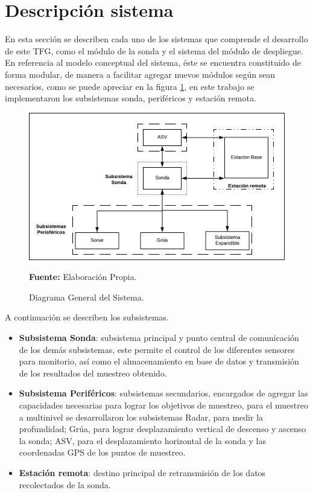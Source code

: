 \section{Descripci\'on  sistema }
En esta sección se describen cada uno de los sistemas que comprende el desarrollo de este TFG, como el m\'odulo de la sonda y el sistema del m\'odulo de despliegue.
En referencia al modelo conceptual del sistema, éste se encuentra constituido de forma modular, de manera a facilitar agregar nuevos m\'odulos seg\'un sean necesarios, como se puede apreciar en la figura \ref{fig:DiagramaGeneral}, en este trabajo se implementaron los subsistemas sonda, perif\'ericos y estación remota.  

\begin{figure}[H]
    \centering
    \includegraphics[scale=0.4]{Imagenes/cap1/Diagrama.png}
    \caption[Diagrama General del Sistema]{Diagrama General del Sistema. }{\textbf{Fuente:} Elaboración Propia.}
    \label{fig:DiagramaGeneral}
\end{figure}

A continuación se describen los subsistemas.
\begin{itemize}
    \item \textbf{Subsistema Sonda}: subsistema principal y punto central de comunicaci\'on de los dem\'as subsistemas, este permite el control de los diferentes sensores para monitorio, as\'i como el almacenamiento en base de datos y transmisión de los resultados del muestreo obtenido.
    \item \textbf{Subsistema Perif\'ericos}: subsistemas secundarios, encargados de agregar las capacidades necesarias para lograr los objetivos de muestreo, para el muestreo a multinivel se desarrollaron los subsistemas Radar, para medir la profundidad; Gr\'ua, para lograr desplazamiento vertical de descenso y ascenso la sonda; ASV, para el desplazamiento horizontal de la sonda y las coordenadas GPS de los puntos de  muestreo. 
    \item \textbf{Estaci\'on remota}: destino principal de retransmisi\'on de los datos recolectados de la sonda. 
\end{itemize}


